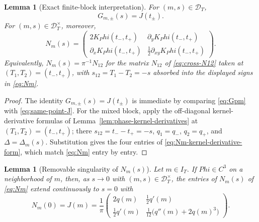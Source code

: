 \documentclass[11pt,a4paper]{amsart}
\def\Phi{Phi}%
\numberwithin{equation}{section}
\theoremstyle{plain}
\newtheorem{lemma}[theorem]{Lemma}
\theoremstyle{definition}
\newcommand{\Ph}{\Phi}
\newcommand{\Del}{\Delta}
\begin{document}
\begin{lemma}[Exact finite-block interpretation]
\label{lem:finite-blocks-exact-interpretation}
For \((m,s)\in\mathcal D_T\),
\[
        G_{m,\pm}(s) = J(t_\pm).
\]
For \((m,s)\in\mathcal D_T^\times\), moreover,
\begin{equation}
\label{eq:Nm-kernel-derivative-form}
N_m(s)
=
\begin{pmatrix}
2K_\Ph(t_-,t_+) & \partial_y K_\Ph(t_-,t_+)\\[0.6ex]
\partial_x K_\Ph(t_-,t_+) & \tfrac12\partial_{xy}K_\Ph(t_-,t_+)
\end{pmatrix}.
\end{equation}
Equivalently, \(N_m(s) = \pi^{-1} N_{12}\) for the matrix \(N_{12}\) of
\eqref{eq:cross-N12} taken at \((T_1, T_2) = (t_-, t_+)\), with
\(s_{12} = T_1 - T_2 = -s\) absorbed into the displayed signs in
\eqref{eq:Nm}.
\end{lemma}

\begin{proof}
The identity \(G_{m,\pm}(s) = J(t_\pm)\) is immediate by comparing
\eqref{eq:Gpm} with \eqref{eq:same-point-J}.  For the mixed block,
apply the off-diagonal kernel-derivative formulas of
Lemma~\ref{lem:phase-kernel-derivatives} at
\((T_1, T_2) = (t_-, t_+)\); there \(s_{12} = t_- - t_+ = -s\),
\(q_1 = q_-\), \(q_2 = q_+\), and \(\Delta = \Del_m(s)\).
Substitution gives the four entries of
\eqref{eq:Nm-kernel-derivative-form}, which match \eqref{eq:Nm} entry
by entry.
\end{proof}

\begin{lemma}[Removable singularity of \(N_m(s)\)]
\label{lem:Nm-removable-singularity}
Let \(m\in I_T\).  If \(\Ph\in C^3\) on a neighborhood of \(m\), then,
as \(s\to 0\) with \((m,s)\in\mathcal D_T^\times\), the entries of
\(N_m(s)\) of \eqref{eq:Nm} extend continuously to \(s=0\) with
\begin{equation}
\label{eq:Nm-at-zero}
        N_m(0) = J(m)
        = \frac1\pi
        \begin{pmatrix}
        2q(m) & \tfrac12 q'(m)\\[0.8ex]
        \tfrac12 q'(m) & \tfrac1{12}\bigl(q''(m)+2q(m)^3\bigr)
        \end{pmatrix}.
\end{equation}
\end{lemma}
\end{document}
